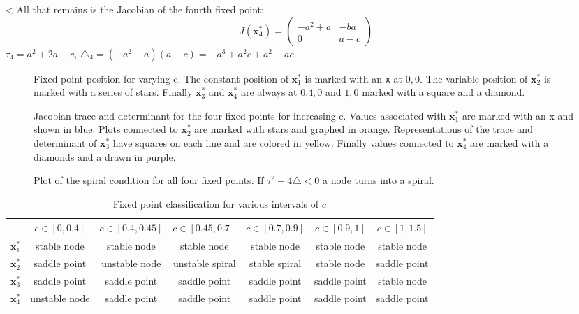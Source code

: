 <
All that remains is the Jacobian of the fourth fixed point:
\begin{equation}
J(\mathbf{x_4^*}) = \begin{pmatrix}
-a ^2 + a & -ba \\
0 & a-c 
\end{pmatrix}
\label{eq:Jx4}
\end{equation}
$\tau_4 = a^2 + 2a -c$, $\triangle_4 = (-a ^2 + a)(a-c)= -a^3 + a^2c + a^2 - ac$. 

\begin{figure}
\centering

\caption{Fixed point position for varying c. The constant position of $\mathbf{x}_1^*$ is marked with an \texttt{x} at $0,0$. The variable position of $\mathbf{x}_2^*$ is marked with a series of stars. Finally $\mathbf{x}_3^*$ and $\mathbf{x}_4^*$ are always at $0.4,0$ and $1,0$ marked with a square and a diamond.}
\label{fig:fixedPos}




\caption{Jacobian trace and determinant for the four fixed points for increasing c. Values associated with $\mathbf{x}_1^*$ are marked with an x and shown in blue. Plots connected to $\mathbf{x}_2^*$ are marked with stars and graphed in orange. Representations of the trace and determinant of $\mathbf{x}_3^*$ have squares on each line and are colored in yellow. Finally values connected to $\mathbf{x}_4^*$ are marked with a diamonds and a drawn in purple.}
\end{figure}
\begin{figure}
\centering

\caption{Plot of the spiral condition for all four fixed points. If $\tau^2 - 4\triangle < 0$ a node turns into a spiral.}
\end{figure}

\begin{table}
\begin{tabular}{|c|c|c|c|c|c|c|}
\hline
				 &	$c \in [0,0.4] $ & $c \in [0.4,0.45] $ & $c \in [0.45,0.7] $ & $c \in [0.7,0.9]$ & $c \in [0.9,1]$ & $c \in [1,1.5] $  \\
\hline
$\mathbf{x}_1^*$ &	stable node		 &	stable node		   &	stable node 	 &	 stable node   & stable node  & stable node  	\\
\hline
$\mathbf{x}_2^*$ &	saddle point	 &	unstable node	   &	unstable spiral	 & stable spiral   & stable node  &	saddle point   \\
\hline
$\mathbf{x}_3^*$ &	saddle point	 & saddle point		   &    saddle point	 &	saddle point   & saddle point & stable node		\\
\hline
$\mathbf{x}_4^*$ &	unstable node	 &	saddle point	   &	saddle point	 & saddle point	   & saddle point & saddle point   \\
\hline
\end{tabular}
\caption{Fixed point classification for various intervals of $c$}
\label{tab:class}
\end{table}

